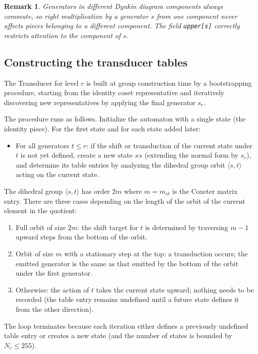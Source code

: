 \documentclass[12pt]{amsart}
\newtheorem{remark}[theorem]{Remark}
\begin{document}
\begin{remark}
Generators in different Dynkin diagram components always commute, so right
multiplication by a generator $s$ from one component never affects pieces
belonging to a different component.  The field \texttt{upper[s]} correctly
restricts attention to the component of $s$.
\end{remark}

\subsection{Constructing the transducer tables}

The Transducer for level $r$ is built at group construction time by a
bootstrapping procedure, starting from the identity coset representative and
iteratively discovering new representatives by applying the final generator
$s_r$.

The procedure runs as follows.  Initialize the automaton with a single state
(the identity piece).  For the first state and for each state added later:
\begin{itemize}
  \item For all generators $t \leq r$: if the shift or transduction of the
    current state under $t$ is not yet defined, create a new state $xs$
    (extending the normal form by $s_r$), and determine its table entries
    by analyzing the dihedral group orbit $\langle s, t \rangle$ acting on
    the current state.
\end{itemize}
The dihedral group $\langle s, t \rangle$ has order $2m$ where $m = m_{st}$ is
the Coxeter matrix entry.  There are three cases depending on the length of the
orbit of the current element in the quotient:
\begin{enumerate}
  \item Full orbit of size $2m$: the shift target for $t$ is determined by
    traversing $m-1$ upward steps from the bottom of the orbit.
  \item Orbit of size $m$ with a stationary step at the top: a transduction
    occurs; the emitted generator is the same as that emitted by the bottom
    of the orbit under the first generator.
  \item Otherwise: the action of $t$ takes the current state upward;
    nothing needs to be recorded (the table entry remains undefined until
    a future state defines it from the other direction).
\end{enumerate}
The loop terminates because each iteration either defines a previously
undefined table entry or creates a new state (and the number of states is
bounded by $N_r \leq 255$).
\end{document}
